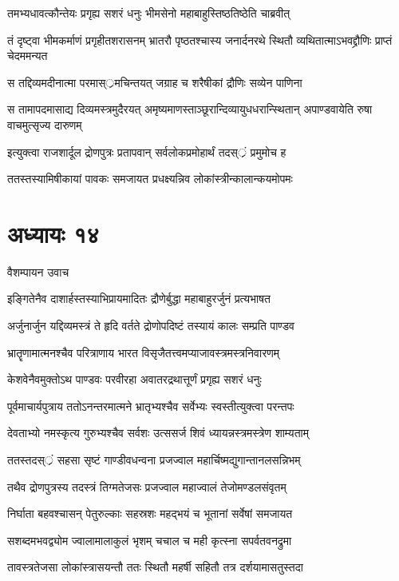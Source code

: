 \twolineshloka
{तमभ्यधावत्कौन्तेयः प्रगृह्य सशरं धनुः}
{भीमसेनो महाबाहुस्तिष्ठतिष्ठेति चाब्रवीत्}


\threelineshloka
{तं दृष्ट्वा भीमकर्माणं प्रगृहीतशरासनम्}
{भ्रातरौ पृष्ठतश्चास्य जनार्दनरथे स्थितौ}
{व्यथितात्माऽभवद्द्रौणिः प्राप्तं चेदममन्यत}


\twolineshloka
{स तद्दिव्यमदीनात्मा परमास््रमचिन्तयत्}
{जग्राह च शरैषीकां द्रौणिः सव्येन पाणिना}


\threelineshloka
{स तामापदमासाद्य दिव्यमस्त्रमुदैरयत्}
{अमृष्यमाणस्ताञ्छूरान्दिव्यायुधधरान्स्थितान्}
{अपाण्डवायेति रुषा वाचमुत्सृज्य दारुणम्}


\twolineshloka
{इत्युक्त्वा राजशार्दूल द्रोणपुत्रः प्रतापवान्}
{सर्वलोकप्रमोहार्थं तदस््रं प्रमुमोच ह}


\twolineshloka
{ततस्तस्यामिषीकायां पावकः समजायत}
{प्रधक्ष्यन्निव लोकांस्त्रीन्कालान्कयमोपमः}


\chapter{अध्यायः १४}
\twolineshloka
{वैशम्पायन उवाच}
{}


\twolineshloka
{इङ्गितेनैव दाशार्हस्तस्याभिप्रायमादितः}
{द्रौणेर्बुद्धा महाबाहुरर्जुनं प्रत्यभाषत}


\twolineshloka
{अर्जुनार्जुन यद्दिव्यमस्त्रं ते हृदि वर्तते}
{द्रोणोपदिष्टं तस्यायं कालः सम्प्रति पाण्डव}


\twolineshloka
{भ्रातॄणामात्मनश्चैव परित्राणाय भारत}
{विसृजैतत्त्वमप्याजावस्त्रमस्त्रनिवारणम्}


\twolineshloka
{केशवेनैवमुक्तोऽथ पाण्डवः परवीरहा}
{अवातरद्रथात्तूर्णं प्रगृह्य सशरं धनुः}


\twolineshloka
{पूर्वमाचार्यपुत्राय ततोऽनन्तरमात्मने}
{भ्रातृभ्यश्चैव सर्वेभ्यः स्वस्तीत्युक्त्वा परन्तपः}


\twolineshloka
{देवताभ्यो नमस्कृत्य गुरुभ्यश्चैव सर्वशः}
{उत्ससर्ज शिवं ध्यायन्नस्त्रमस्त्रेण शाम्यताम्}


\twolineshloka
{ततस्तदस््रं सहसा सृष्टं गाण्डीवधन्वना}
{प्रजज्वाल महार्चिष्मद्युगान्तानलसन्निभम्}


\twolineshloka
{तथैव द्रोणपुत्रस्य तदस्त्रं तिग्मतेजसः}
{प्रजज्वाल महाज्वालं तेजोमण्डलसंवृतम्}


\twolineshloka
{निर्घाता बहवश्चासन् पेतुरुल्काः सहस्रशः}
{महद्भयं च भूतानां सर्वेषां समजायत}


\twolineshloka
{सशब्दमभवद्व्योम ज्वालामालाकुलं भृशम्}
{चचाल च मही कृत्स्ना सपर्वतवनद्रुमा}


\twolineshloka
{तावस्त्रतेजसा लोकांस्त्रासयन्तौ ततः स्थितौ}
{महर्षी सहितौ तत्र दर्शयामासतुस्तदा}


